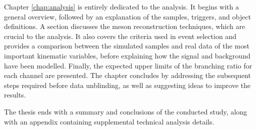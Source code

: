 Chapter \ref{chap:analysis} is entirely dedicated to the analysis. It begins with a general overview, followed by an explanation of the samples, triggers, and object definitions. A section discusses the meson reconstruction techniques, which are crucial to the analysis. It also covers the criteria used in event selection and provides a comparison between the simulated samples and real data of the most important kinematic variables, before explaining how the signal and background have been modelled. Finally, the expected upper limits of the branching ratio for each channel are presented. The chapter concludes by addressing the subsequent steps required before data unblinding, as well as suggesting ideas to improve the results.

The thesis ends with a summary and conclusions of the conducted study, along with an appendix containing supplemental technical analysis details.
